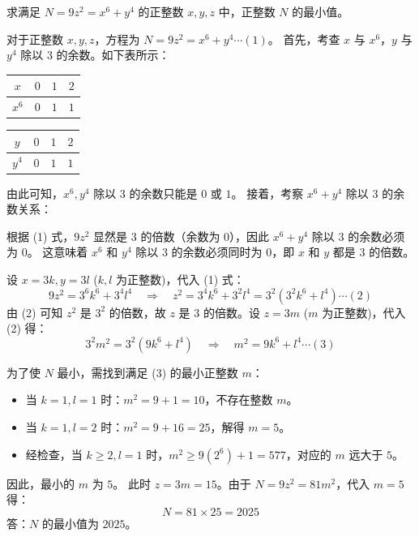 \begin{questions}
\question
求满足 $N = 9z^2 = x^6 + y^4$ 的正整数 $x, y, z$ 中，正整数 $N$ 的最小值。

\begin{solution}
    对于正整数 $x, y, z$，方程为 $N = 9z^2 = x^6 + y^4 \cdots (1)$。
    首先，考查 $x$ 与 $x^6$，$y$ 与 $y^4$ 除以 $3$ 的余数。如下表所示：
    
    \begin{center}
    \begin{tabular}{|c|c|c|c|}
    \hline
    $x$ & $0$ & $1$ & $2$ \\ \hline
    $x^6$ & $0$ & $1$ & $1$ \\ \hline
    \end{tabular}
    \quad
    \begin{tabular}{|c|c|c|c|}
    \hline
    $y$ & $0$ & $1$ & $2$ \\ \hline
    $y^4$ & $0$ & $1$ & $1$ \\ \hline
    \end{tabular}
    \end{center}
    
    由此可知，$x^6, y^4$ 除以 $3$ 的余数只能是 $0$ 或 $1$。
    接着，考察 $x^6 + y^4$ 除以 $3$ 的余数关系：
    
    
    根据 (1) 式，$9z^2$ 显然是 $3$ 的倍数（余数为 $0$），因此 $x^6 + y^4$ 除以 $3$ 的余数必须为 $0$。
    这意味着 $x^6$ 和 $y^4$ 除以 $3$ 的余数必须同时为 $0$，即 $x$ 和 $y$ 都是 $3$ 的倍数。
    
    设 $x = 3k, y = 3l$ ($k, l$ 为正整数)，代入 (1) 式：
    \[ 9z^2 = 3^6 k^6 + 3^4 l^4 \quad \Rightarrow \quad z^2 = 3^4 k^6 + 3^2 l^4 = 3^2(3^2 k^6 + l^4) \cdots (2)  \]
    由 (2) 可知 $z^2$ 是 $3^2$ 的倍数，故 $z$ 是 $3$ 的倍数。设 $z = 3m$ ($m$ 为正整数)，代入 (2) 得：
    \[ 3^2 m^2 = 3^2(9k^6 + l^4) \quad \Rightarrow \quad m^2 = 9k^6 + l^4 \cdots (3)  \]
    
    为了使 $N$ 最小，需找到满足 (3) 的最小正整数 $m$：
    \begin{itemize}
        \item 当 $k=1, l=1$ 时：$m^2 = 9+1 = 10$，不存在整数 $m$。
        \item 当 $k=1, l=2$ 时：$m^2 = 9+16 = 25$，解得 $m=5$。
        \item 经检查，当 $k \ge 2, l=1$ 时，$m^2 \ge 9(2^6) + 1 = 577$，对应的 $m$ 远大于 $5$。
    \end{itemize}
    因此，最小的 $m$ 为 $5$。
    此时 $z = 3m = 15$。由于 $N = 9z^2 = 81m^2$，代入 $m=5$ 得：
    \[ N = 81 \times 25 = 2025  \]
    答：$N$ 的最小值为 $2025$。
\end{solution}


\end{questions}
